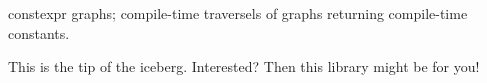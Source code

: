 constexpr graphs; compile-\/time traversels of graphs returning compile-\/time constants.

This is the tip of the iceberg. Interested? Then this library might be for you! 